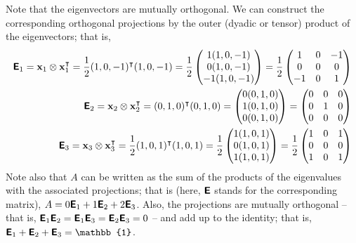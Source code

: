 {Note that the eigenvectors are mutually orthogonal.
We can construct the corresponding orthogonal projections by the outer (dyadic or tensor) product
of the eigenvectors; that is,
\begin{equation}
\begin{split}
\textsf{\textbf{E}}_1 =
{\bf x}_1 \otimes {\bf x}_1^\intercal  =
\frac{1}{2} (1,0,-1)^\intercal (1,0,-1) =
\frac{1}{2}
\begin{pmatrix}
1(1,0,-1)\\
0(1,0,-1)\\
-1(1,0,-1)
\end{pmatrix} =
\frac{1}{2}
\begin{pmatrix}
1&0&-1\\
0&0&0\\
-1&0&1
\end{pmatrix}
\\
\textsf{\textbf{E}}_{2} =
{\bf x}_{2} \otimes {\bf x}_{2}^\intercal  =
 (0,1,0)^\intercal (0,1,0) =
\begin{pmatrix}
0(0,1,0)\\
1(0,1,0)\\
0(0,1,0)
\end{pmatrix} =
\begin{pmatrix}
0&0&0\\
0&1&0\\
0&0&0
\end{pmatrix}
\\
\textsf{\textbf{E}}_{3} =
{\bf x}_{3} \otimes {\bf x}_{3}^\intercal  =
\frac{1}{2} (1,0,1)^\intercal (1,0,1) =
\frac{1}{2}
\begin{pmatrix}
1(1,0,1)\\
0(1,0,1)\\
1(1,0,1)
\end{pmatrix} =
\frac{1}{2}
\begin{pmatrix}
1&0&1\\
0&0&0\\
1&0&1
\end{pmatrix}
\end{split}
\end{equation}
Note also that $A$ can be written as the sum of the products of the
eigenvalues with the associated projections; that is (here, $\textsf{\textbf{E}}$
stands for the corresponding matrix),
$A= 0  \textsf{\textbf{E}}_1 + 1  \textsf{\textbf{E}}_{2} +2\textsf{\textbf{E}}_{3} $.
Also, the projections are mutually orthogonal
-- that is,
$\textsf{\textbf{E}}_1 \textsf{\textbf{E}}_2 = \textsf{\textbf{E}}_1\textsf{\textbf{E}}_3=\textsf{\textbf{E}}_2\textsf{\textbf{E}}_3=0$
--
and add up to the identity; that is,
$\textsf{\textbf{E}}_1+\textsf{\textbf{E}}_2+\textsf{\textbf{E}}_3=\mathbb{1}$.
{\textrm{\eexample}}
}

